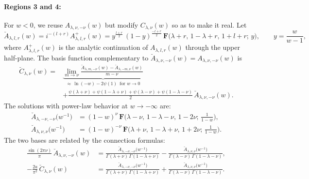 \documentclass[11pt]{article}
\newcommand{\hgfs}{\mathbf{F}}
\newcommand{\bA}{\breve{A}}
\newcommand{\bC}{\breve{C}}
\begin{document}
\paragraph{Regions 3 and 4:} For $w<0$, we reuse $A_{\lambda,\nu,-\nu}(w)$ but modify $C_{\lambda,\nu}(w)$ so as to make it real. Let
\begin{equation} \label{bAf}
\bA_{\lambda,l,r}(w)=i^{-(l+r)}A^{+}_{\lambda,l,r}(w)
=y^{\frac{l+r}{2}}\,(1-y)^{\frac{-l+r}{2}}\,
\hgfs\bigl(\lambda+r,\,1-\lambda+r,\,1+l+r;\, y\bigr),\qquad y=\frac{w}{w-1},
\end{equation}
where $A^{+}_{\lambda,l,r}(w)$ is the analytic continuation of $A_{\lambda,l,r}(w)$ through the upper half-plane. The basis function complementary to $\bA_{\lambda,\nu,-\nu}(w)=A_{\lambda,\nu,-\nu}(w)$ is
\begin{equation}
\begin{aligned} \label{bCf}
\bC_{\lambda,\nu}(w)={}&
\underbrace{\lim_{m\to\nu}
\frac{\bA_{\lambda,m,-\nu}(w)-\bA_{\lambda,-m,\nu}(w)}{m-\nu}}
_{\approx\,\ln(-w)-2\psi(1)\, \text{ for } w\to 0}\\[2pt]
&+\frac{\psi(\lambda+\nu)+\psi(1-\lambda+\nu)
+\psi(\lambda-\nu)+\psi(1-\lambda-\nu)}{2}\,\bA_{\lambda,\nu,-\nu}(w).
\end{aligned}
\end{equation}
The solutions with power-law behavior at $w\to-\infty$ are:
\begin{equation}
\begin{aligned}
\bA_{\lambda,-\nu,-\nu} \big( w^{-1} \big)
&=(1-w)^{\nu}\,\hgfs\big(\lambda-\nu,\,1-\lambda-\nu,\,1-2\nu;\,
\tfrac{1}{1-w}\big),\\[3pt]
\bA_{\lambda,\nu,\nu} \bigl( w^{-1} \bigr)
&=(1-w)^{-\nu}\,\hgfs\bigl(\lambda+\nu,\,1-\lambda+\nu,\,1+2\nu;\,
\tfrac{1}{1-w}\bigr).
\end{aligned}
\end{equation}
The two bases are related by the connection formulas:
\begin{equation}
\begin{aligned}
\frac{\sin(2\pi\nu)}{\pi}\,\bA_{\lambda,\nu,-\nu}(w)
&=\frac{\bA_{\lambda,-\nu,-\nu}\big(w^{-1}\big)}
{\Gamma(\lambda+\nu)\,\Gamma(1-\lambda+\nu)}
-\frac{\bA_{\lambda,\nu,\nu}\big(w^{-1}\big)}
{\Gamma(\lambda-\nu)\,\Gamma(1-\lambda-\nu)},
\\[3pt]
-\frac{2a}{\pi^2}\,\bC_{\lambda,\nu}(w)
&=\frac{\bA_{\lambda,-\nu,-\nu}\big(w^{-1}\big)}
{\Gamma(\lambda+\nu)\,\Gamma(1-\lambda+\nu)}
+\frac{\bA_{\lambda,\nu,\nu}\big(w^{-1}\big)}
{\Gamma(\lambda-\nu)\,\Gamma(1-\lambda-\nu)}.
\end{aligned}
\end{equation}
\end{document}
